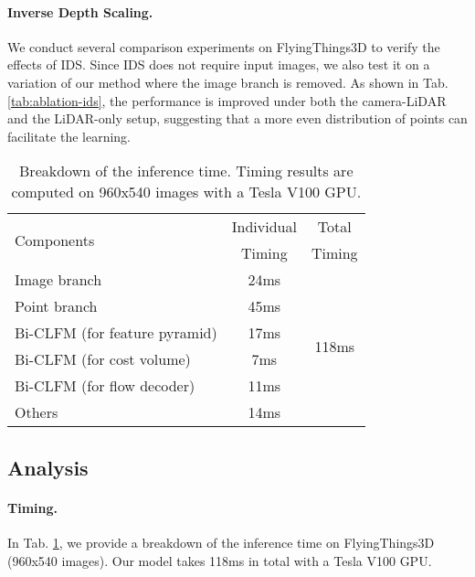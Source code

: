 \documentclass[10pt,twocolumn,letterpaper]{article}
\begin{document}
\vspace{-10pt}
\paragraph{Inverse Depth Scaling.} We conduct several comparison experiments on FlyingThings3D to verify the effects of IDS. Since IDS does not require input images, we also test it on a variation of our method where the image branch is removed. As shown in Tab. \ref{tab:ablation-ids}, the performance is improved under both the camera-LiDAR and the LiDAR-only setup, suggesting that a more even distribution of points can facilitate the learning.

\begin{table}[t]
    \centering
    \begin{tabular}{l|c|c}
        \hline
        \multirow{2}{*}{Components} & Individual & Total \\
        & Timing & Timing \\
        \hline
        Image branch & 24ms & \multirow{6}{*}{118ms} \\
        Point branch & 45ms & \\
        Bi-CLFM (for feature pyramid) & 17ms & \\
        Bi-CLFM (for cost volume) & 7ms & \\
        Bi-CLFM (for flow decoder) & 11ms & \\
        Others & 14ms & \\
        \hline
    \end{tabular}
    \vspace{-5pt}
    \caption{Breakdown of the inference time. Timing results are computed on 960x540 images with a Tesla V100 GPU.}
    \vspace{-10pt}
    \label{tab:runtime}
\end{table}

\subsection{Analysis}

\paragraph{Timing.} In Tab. \ref{tab:runtime}, we provide a breakdown of the inference time on FlyingThings3D (960x540 images). Our model takes 118ms in total with a Tesla V100 GPU.

\vspace{-10pt}
\end{document}
